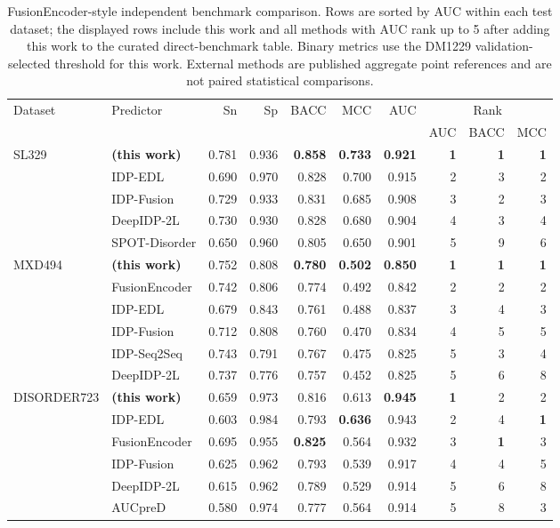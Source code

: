 \begin{table}[!t]
\centering
\caption{FusionEncoder-style independent benchmark comparison. Rows are sorted by AUC within each test dataset; the displayed rows include this work and all methods with AUC rank up to 5 after adding this work to the curated direct-benchmark table. Binary metrics use the DM1229 validation-selected threshold for this work. External methods are published aggregate point references and are not paired statistical comparisons.}
\label{tab:full}
\scriptsize
\setlength{\tabcolsep}{2.6pt}
\begin{tabular}{llrrrrrrrr}
\toprule
Dataset & Predictor & Sn & Sp & BACC & MCC & AUC & \multicolumn{3}{c}{Rank} \\
\cmidrule(lr){8-10}
 & & & & & & & AUC & BACC & MCC \\
\midrule
SL329 & \textbf{\method{} (this work)} & 0.781 & 0.936 & \textbf{0.858} & \textbf{0.733} & \textbf{0.921} & \textbf{1} & \textbf{1} & \textbf{1} \\
 & IDP-EDL & 0.690 & 0.970 & 0.828 & 0.700 & 0.915 & 2 & 3 & 2 \\
 & IDP-Fusion & 0.729 & 0.933 & 0.831 & 0.685 & 0.908 & 3 & 2 & 3 \\
 & DeepIDP-2L & 0.730 & 0.930 & 0.828 & 0.680 & 0.904 & 4 & 3 & 4 \\
 & SPOT-Disorder & 0.650 & 0.960 & 0.805 & 0.650 & 0.901 & 5 & 9 & 6 \\
\midrule
MXD494 & \textbf{\method{} (this work)} & 0.752 & 0.808 & \textbf{0.780} & \textbf{0.502} & \textbf{0.850} & \textbf{1} & \textbf{1} & \textbf{1} \\
 & FusionEncoder & 0.742 & 0.806 & 0.774 & 0.492 & 0.842 & 2 & 2 & 2 \\
 & IDP-EDL & 0.679 & 0.843 & 0.761 & 0.488 & 0.837 & 3 & 4 & 3 \\
 & IDP-Fusion & 0.712 & 0.808 & 0.760 & 0.470 & 0.834 & 4 & 5 & 5 \\
 & IDP-Seq2Seq & 0.743 & 0.791 & 0.767 & 0.475 & 0.825 & 5 & 3 & 4 \\
 & DeepIDP-2L & 0.737 & 0.776 & 0.757 & 0.452 & 0.825 & 5 & 6 & 8 \\
\midrule
DISORDER723 & \textbf{\method{} (this work)} & 0.659 & 0.973 & 0.816 & 0.613 & \textbf{0.945} & \textbf{1} & 2 & 2 \\
 & IDP-EDL & 0.603 & 0.984 & 0.793 & \textbf{0.636} & 0.943 & 2 & 4 & \textbf{1} \\
 & FusionEncoder & 0.695 & 0.955 & \textbf{0.825} & 0.564 & 0.932 & 3 & \textbf{1} & 3 \\
 & IDP-Fusion & 0.625 & 0.962 & 0.793 & 0.539 & 0.917 & 4 & 4 & 5 \\
 & DeepIDP-2L & 0.615 & 0.962 & 0.789 & 0.529 & 0.914 & 5 & 6 & 8 \\
 & AUCpreD & 0.580 & 0.974 & 0.777 & 0.564 & 0.914 & 5 & 8 & 3 \\
\bottomrule
\end{tabular}
\end{table}
